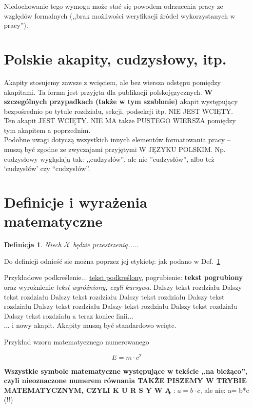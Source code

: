 \documentclass[12pt]{report}
\newtheorem{definition}{Definicja} %
\begin{document}
Niedochowanie tego wymogu może stać się powodem odrzucenia pracy ze wzglę\-dów
formalnych (,,brak możliwości weryfikacji źródeł wykorzystanych w pracy''). 

\section{Polskie akapity, cudzysłowy, itp.}
Akapity stosujemy zawsze z wcięciem, ale bez wiersza odstępu pomiędzy akapitami. 
Ta forma jest przyjęta dla publikacji polskojęzycznych. {\bf W szczególnych
przypadkach (także w tym szablonie)} akapit występujący bezpośrednio po tytule
rozdziału, sekcji, podsekcji itp. NIE JEST WCIĘTY.\\
\indent Ten akapit JEST WCIĘTY. NIE MA także PUSTEGO WIERSZA pomiędzy tym
akapitem a poprzednim. \\
\indent Podobne uwagi dotyczą wszystkich innych elementów formatowania pracy --
muszą być zgodne ze zwyczajami przyjętymi W JĘZYKU POLSKIM.	Np. cu\-dzysłowy
wyglądają tak: ,,cudzysłów'', ale nie ''cudzysłów'', albo też `cudzysłów' czy
``cudzysłów''. 



\section{Definicje i wyrażenia matematyczne}
\begin{definition} \label{def.definicja1}
Niech $\cal X$ będzie przestrzenią.....
\end{definition}

Do definicji odnieść sie można poprzez jej etykietę: jak podano w Def.~\ref{def.definicja1}

Przykładowe podkreślenie... \underline{tekst podkreślony}, pogrubienie: {\bf
tekst pogrubiony} oraz wyrożnienie {\em tekst wyróżniony, czyli kursywa}. 
Dalszy tekst rozdziału
Dalszy tekst rozdziału
Dalszy tekst rozdziału
Dalszy tekst rozdziału
Dalszy tekst rozdziału
Dalszy tekst rozdziału
Dalszy tekst rozdziału
Dalszy tekst rozdziału
Dalszy tekst rozdziału a teraz koniec linii... \\
\indent ... i nowy akapit. Akapity muszą być standardowo wcięte.  


Przykład wzoru matematycznego numerowanego

\begin{equation} \label{wzoreinsteina}
E=m\cdot c^2
\end{equation}

{\bf Wszystkie symbole matematyczne występujące w tekście ,,na bieżąco'',
czyli nieoznaczone numerem równania TAKŻE PISZEMY W TRYBIE MATEMA\-TYCZNYM, CZYLI
K U R S Y W Ą} : $a=b\cdot c$, ale nie: a= b*c (!!)\\
\end{document}
